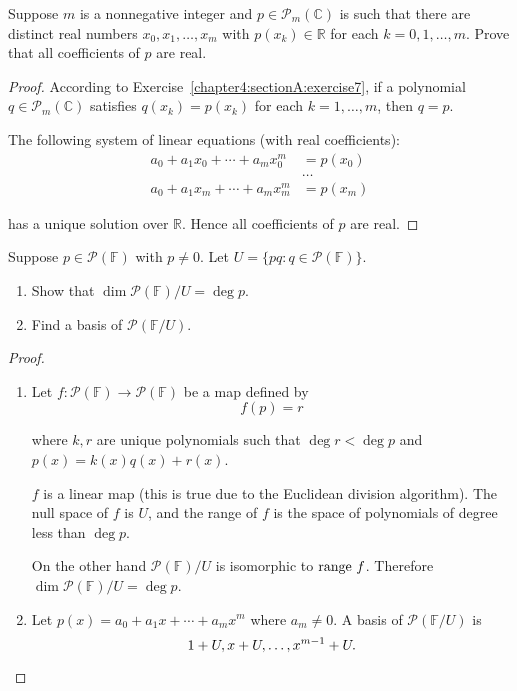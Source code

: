 \begin{exercise}
    Suppose $m$ is a nonnegative integer and $p \in \mathscr{P}_{m} (\mathbb{C})$ is such that there are distinct real numbers $x_{0} , x_{1} , \ldots, x_{m}$ with $p(x_{k}) \in \mathbb{R}$ for each $k = 0, 1, \ldots, m$. Prove that all coefficients of $p$ are real.
\end{exercise}

\begin{proof}
    According to Exercise~\ref{chapter4:sectionA:exercise7}, if a polynomial $q\in\mathscr{P}_{m}(\mathbb{C})$ satisfies $q(x_{k}) = p(x_{k})$ for each $k = 1,\ldots, m$, then $q = p$.

    The following system of linear equations (with real coefficients):
    \begin{align*}
        a_{0} + a_{1}x_{0} + \cdots + a_{m}x_{0}^{m} & = p(x_{0}) \\
                                                     & \ldots     \\
        a_{0} + a_{1}x_{m} + \cdots + a_{m}x_{m}^{m} & = p(x_{m})
    \end{align*}

    has a unique solution over $\mathbb{R}$. Hence all coefficients of $p$ are real.
\end{proof}
\newpage

\begin{exercise}
    Suppose $p\in\mathscr{P}(\mathbb{F})$ with $p\ne 0$. Let $U = \{ pq: q\in\mathscr{P}(\mathbb{F}) \}$.
    \begin{enumerate}[label={(\alph*)}]
        \item Show that $\dim\mathscr{P}(\mathbb{F})/U = \deg p$.
        \item Find a basis of $\mathscr{P}(\mathbb{F}/U)$.
    \end{enumerate}
\end{exercise}

\begin{proof}
    \begin{enumerate}[label={(\alph*)}]
        \item Let $f: \mathscr{P}(\mathbb{F})\to \mathscr{P}(\mathbb{F})$ be a map defined by
              \[
                  f(p) = r
              \]

              where $k, r$ are unique polynomials such that $\deg r < \deg p$ and $p(x) = k(x)q(x) + r(x)$.

              $f$ is a linear map (this is true due to the Euclidean division algorithm). The null space of $f$ is $U$, and the range of $f$ is the space of polynomials of degree less than $\deg p$.

              On the other hand $\mathscr{P}(\mathbb{F})/U$ is isomorphic to $\operatorname{range}\,{f}$. Therefore $\dim\mathscr{P}(\mathbb{F})/U = \deg p$.
        \item Let $p(x) = a_{0} + a_{1}x + \cdots + a_{m}x^{m}$ where $a_{m}\ne 0$. A basis of $\mathscr{P}(\mathbb{F}/U)$ is
              \[
                  1 + U, x + U, \ldots, x^{m-1} + U.\qedhere
              \]
    \end{enumerate}
\end{proof}
\newpage

